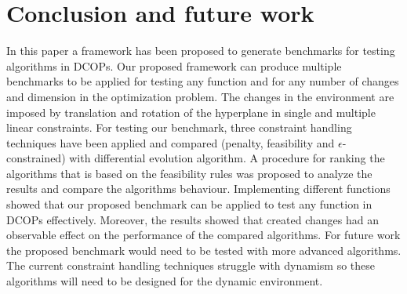\documentclass[conference]{IEEEtran}
\begin{document}
\section{Conclusion and future work} \label{sec:conclusion}
In this paper a framework has been proposed to generate benchmarks for testing algorithms in DCOPs. Our proposed framework can produce multiple benchmarks to be applied for testing any function and for any number of changes and dimension in the optimization problem. The changes in the environment are imposed by translation and rotation of the hyperplane in single and multiple linear constraints.
For testing our benchmark, three constraint handling techniques have been applied and compared (penalty, feasibility and $\epsilon$-constrained) with differential evolution algorithm. A procedure for ranking the algorithms that is based on the feasibility rules was proposed to analyze the results and compare the algorithms behaviour.
Implementing different functions showed that our proposed benchmark can be applied to test any function in DCOPs effectively.
Moreover, the results showed that created changes had an observable effect on the performance of the compared algorithms. 
For future work the proposed benchmark would need to be tested with more advanced algorithms. The current constraint handling techniques struggle with dynamism so these algorithms will need to be designed for the dynamic environment. 




\end{document}
